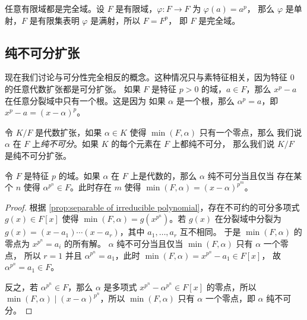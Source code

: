 \begin{example}
  任意有限域都是完全域。设 $F$ 是有限域，$\varphi:F\to F$ 为 $\varphi(a)=a^p$，
  那么 $\varphi$ 是单射，$F$ 是有限集表明 $\varphi$ 是满射，所以 $F=F^p$，
  即 $F$ 是完全域。
\end{example}

\subsection{纯不可分扩张}

现在我们讨论与可分性完全相反的概念。这种情况只与素特征相关，因为特征 $0$ 的任意代数扩张都是可分扩张。
如果 $F$ 是特征 $p>0$ 的域，$a\in F$，那么 $x^p-a$ 在任意分裂域中只有一个根。这是因为
如果 $\alpha$ 是一个根，那么 $\alpha^p=a$，即 $x^p-a=(x-\alpha)^p$。

\begin{definition}
  令 $K/F$ 是代数扩张，如果 $\alpha\in K$ 使得 $\min (F,\alpha)$ 只有一个零点，那么
  我们说 $\alpha$ 在 $F$ 上\emph{纯不可分}。如果 $K$ 的每个元素在 $F$ 上都纯不可分，
  那么我们说 $K/F$ 是纯不可分扩张。
\end{definition}

\begin{lemma}\label{lemma:polynomial of inseparable element}
  令 $F$ 是特征 $p$ 的域。如果 $\alpha$ 在 $F$ 上是代数的，那么 $\alpha$ 纯不可分当且仅当
  存在某个 $n$ 使得 $\alpha^{p^n}\in F$。此时存在 $m$ 使得 $\min(F,\alpha)=(x-\alpha)^{p^m}$。
\end{lemma}
\begin{proof}
  根据 \autoref{prop:separable of irreducible polynomial}，存在不可约的可分多项式
  $g(x)\in F[x]$ 使得 $\min(F,\alpha)=g(x^{p^n})$。若 $g(x)$ 在分裂域中分裂为 
  $g(x)=(x-a_1)\cdots(x-a_r)$，其中 $a_1,\dots,a_r$ 互不相同。
  于是 $\min(F,\alpha)$ 的零点为 $x^{p^n}=a_i$ 的所有解。
  $\alpha$ 纯不可分当且仅当 $\min(F,\alpha)$ 只有 $\alpha$ 一个零点，
  所以 $r=1$ 并且 $\alpha^{p^n}=a_1$，此时 $\min(F,\alpha)=x^{p^n}-a_1\in F[x]$，
  故 $\alpha^{p^n}=a_1\in F$。

  反之，若 $\alpha^{p^n}\in F$，那么 $\alpha$ 是多项式 $x^{p^n}-\alpha^{p^n}\in F[x]$
  的零点，所以 $\min (F,\alpha)\mid (x-\alpha)^{p^n}$，所以 $\min(F,\alpha)$ 只有 $\alpha$
  一个零点，即 $\alpha$ 纯不可分。
\end{proof}

